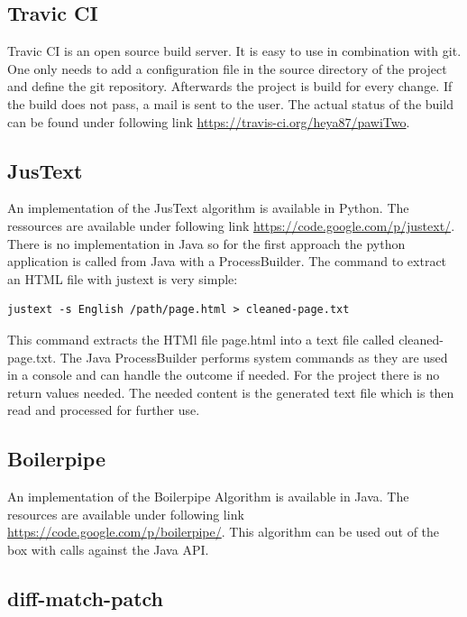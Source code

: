 \subsection{Travic CI}

Travic CI is an open source build server. It is easy to use in combination with git. One only needs to add a configuration file in the source directory of the project and define the git repository. Afterwards the project is build for every change. If the build does not pass, a mail is sent to the user. The actual status of the build can be found under following link \url{https://travis-ci.org/heya87/pawiTwo}.

\subsection{JusText}

An implementation of the JusText algorithm is available in Python. The ressources are available under following link \url{https://code.google.com/p/justext/}. There is no implementation in Java so for the first approach the python application is called from Java with a ProcessBuilder.
The command to extract an HTML file with justext is very simple:

\begin {lstlisting}
justext -s English /path/page.html > cleaned-page.txt
\end{lstlisting}

This command extracts the HTMl file page.html into a text file called cleaned-page.txt. The Java ProcessBuilder performs system commands as they are used in a console and can handle the outcome if needed. For the project there is no return values needed. The needed content is the generated text file which is then read and processed for further use.

\subsection{Boilerpipe}

An implementation of the Boilerpipe Algorithm is available in Java. The resources are available under following link \url{https://code.google.com/p/boilerpipe/}. This algorithm can be used out of the box with calls against the Java API.

\subsection{diff-match-patch}

